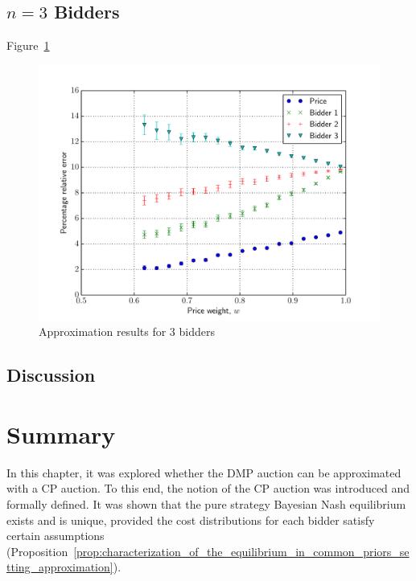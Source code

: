 \subsection{$n=3$ Bidders} %
\label{sub:n_3_bidders_approximation}
Figure~\ref{fig:compare_3_bidders_approximation}

\begin{figure}[t!]
  \includegraphics[width=\figsize]{Approximation/Figures/compare_3_bidders}
  \caption{Approximation results for 3 bidders}
  \label{fig:compare_3_bidders_approximation}
\end{figure}

\subsection{Discussion} %
\label{sub:discussion_approximation}


\section{Summary} %
\label{sec:summary_approximation}
In this chapter, it was explored whether the DMP auction can be approximated with a CP auction. To this end, the notion of the CP auction was introduced and formally defined. It was shown that the pure strategy Bayesian Nash equilibrium exists and is unique, provided the cost distributions for each bidder satisfy certain assumptions (Proposition~\ref{prop:characterization_of_the_equilibrium_in_common_priors_setting_approximation}).


